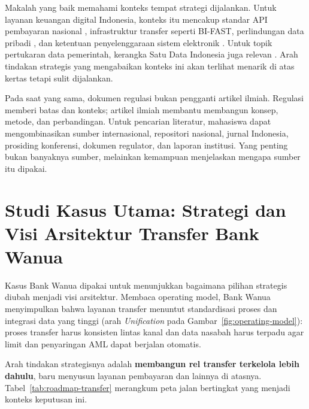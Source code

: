 Makalah yang baik memahami konteks tempat strategi dijalankan. Untuk layanan
keuangan digital Indonesia, konteks itu mencakup standar API pembayaran nasional
\cite{snapbi}, infrastruktur transfer seperti BI-FAST, perlindungan data pribadi
\cite{uupdp2022}, dan ketentuan penyelenggaraan sistem elektronik
\cite{pp712019}. Untuk topik pertukaran data pemerintah, kerangka Satu Data
Indonesia juga relevan \cite{satudata}. Arah tindakan strategis yang mengabaikan
konteks ini akan terlihat menarik di atas kertas tetapi sulit dijalankan.

Pada saat yang sama, dokumen regulasi bukan pengganti artikel ilmiah. Regulasi
memberi batas dan konteks; artikel ilmiah membantu membangun konsep, metode,
dan perbandingan. Untuk pencarian literatur, mahasiswa dapat mengombinasikan
sumber internasional, repositori nasional, jurnal Indonesia, prosiding
konferensi, dokumen regulator, dan laporan institusi. Yang penting bukan
banyaknya sumber, melainkan kemampuan menjelaskan mengapa sumber itu dipakai.

\section{Studi Kasus Utama: Strategi dan Visi Arsitektur Transfer Bank Wanua}

Kasus Bank Wanua dipakai untuk menunjukkan bagaimana pilihan strategis diubah
menjadi visi arsitektur. Membaca operating model, Bank Wanua menyimpulkan bahwa
layanan transfer menuntut standardisasi proses dan integrasi data yang tinggi
(arah \emph{Unification} pada Gambar~\ref{fig:operating-model}): proses transfer
harus konsisten lintas kanal dan data nasabah harus terpadu agar limit dan
penyaringan AML dapat berjalan otomatis.

Arah tindakan strategisnya adalah \textbf{membangun rel transfer terkelola lebih
dahulu}, baru menyusun layanan pembayaran dan lainnya di atasnya.
Tabel~\ref{tab:roadmap-transfer} merangkum peta jalan bertingkat yang menjadi
konteks keputusan ini.

